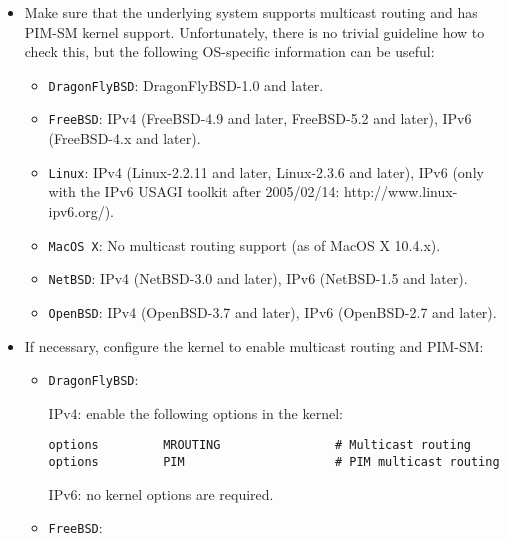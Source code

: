 \begin{itemize}

  \item Make sure that the underlying system supports multicast routing and
  has PIM-SM kernel support. Unfortunately, there is no trivial guideline how
  to check this, but the following OS-specific information can be useful:

  \begin{itemize}

    \item {\tt DragonFlyBSD}: DragonFlyBSD-1.0 and later.

    \item {\tt FreeBSD}: IPv4 (FreeBSD-4.9 and later, FreeBSD-5.2 and later),
    IPv6 (FreeBSD-4.x and later).

    \item {\tt Linux}: IPv4 (Linux-2.2.11 and later, Linux-2.3.6 and later),
    IPv6 (only with the IPv6 USAGI toolkit after 2005/02/14:
    http://www.linux-ipv6.org/).

    \item {\tt MacOS X}: No multicast routing support (as of MacOS X 10.4.x).

    \item {\tt NetBSD}: IPv4 (NetBSD-3.0 and later), IPv6 (NetBSD-1.5
    and later).

    \item {\tt OpenBSD}: IPv4 (OpenBSD-3.7 and later), IPv6 (OpenBSD-2.7 and
    later).

  \end{itemize}

  \item If necessary, configure the kernel to enable multicast routing and
  PIM-SM:

  \begin{itemize}

    \item {\tt DragonFlyBSD}:

    IPv4: enable the following options in the kernel:

\begin{verbatim}
options         MROUTING                # Multicast routing
options         PIM                     # PIM multicast routing
\end{verbatim}

    IPv6: no kernel options are required.

    \item {\tt FreeBSD}:


\end{itemize}
\end{itemize}
